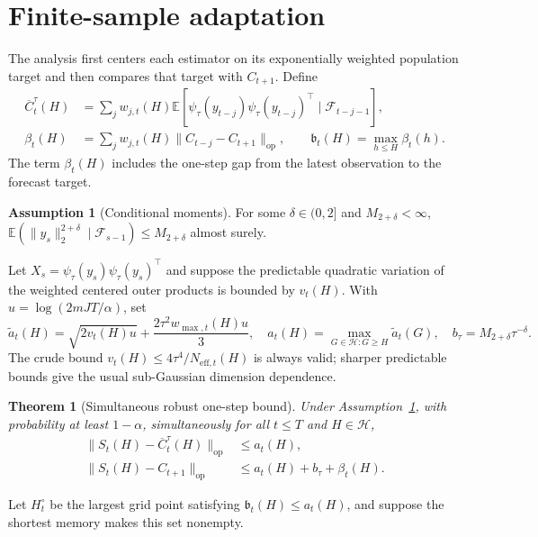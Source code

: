 \documentclass{article}
\newtheorem{theorem}{Theorem}
\theoremstyle{definition}
\newtheorem{assumption}{Assumption}
\theoremstyle{remark}
\newcommand{\E}{\mathbb{E}}
\newcommand{\F}{\mathcal{F}}
\newcommand{\Hh}{\mathcal{H}}
\newcommand{\op}{\mathrm{op}}
\begin{document}
\section{Finite-sample adaptation}
\label{sec:upper}

The analysis first centers each estimator on its exponentially weighted population target and then compares that target with $C_{t+1}$. Define
\begin{align}
 \overline C_t^\tau(H)&=\sum_jw_{j,t}(H)
 \E\!\left[\psi_\tau(y_{t-j})\psi_\tau(y_{t-j})^\top\mid\F_{t-j-1}\right],\\
 \beta_t(H)&=\sum_jw_{j,t}(H)\|C_{t-j}-C_{t+1}\|_{\op},
 \qquad
 \mathfrak b_t(H)=\max_{h\le H}\beta_t(h).
 \label{eq:targets}
\end{align}
The term $\beta_t(H)$ includes the one-step gap from the latest observation to the forecast target.

\begin{assumption}[Conditional moments]
\label{ass:moments}
For some $\delta\in(0,2]$ and $M_{2+\delta}<\infty$,
$\E(\|y_s\|_2^{2+\delta}\mid\F_{s-1})\le M_{2+\delta}$ almost surely.
\end{assumption}

Let $X_s=\psi_\tau(y_s)\psi_\tau(y_s)^\top$ and suppose the predictable quadratic variation of the weighted centered outer products is bounded by $v_t(H)$. With $u=\log(2mJT/\alpha)$, set
\begin{equation}
 \widetilde a_t(H)=\sqrt{2v_t(H)u}+\frac{2\tau^2w_{\max,t}(H)u}{3},
 \quad
 a_t(H)=\max_{G\in\Hh:G\ge H}\widetilde a_t(G),
 \quad
 b_\tau=M_{2+\delta}\tau^{-\delta}.
 \label{eq:radius}
\end{equation}
The crude bound $v_t(H)\le4\tau^4/N_{\mathrm{eff},t}(H)$ is always valid; sharper predictable bounds give the usual sub-Gaussian dimension dependence.

\begin{theorem}[Simultaneous robust one-step bound]
\label{thm:concentration}
Under Assumption~\ref{ass:moments}, with probability at least $1-\alpha$, simultaneously for all $t\le T$ and $H\in\Hh$,
\begin{align}
 \|S_t(H)-\overline C_t^\tau(H)\|_{\op}&\le a_t(H),\label{eq:centered-bound}\\
 \|S_t(H)-C_{t+1}\|_{\op}&\le a_t(H)+b_\tau+\beta_t(H).
 \label{eq:forecast-bound}
\end{align}
\end{theorem}

Let $H_t^\circ$ be the largest grid point satisfying $\mathfrak b_t(H)\le a_t(H)$, and suppose the shortest memory makes this set nonempty.
\end{document}
